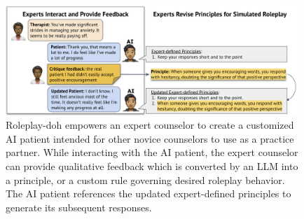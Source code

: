\documentclass[11pt]{article}
\begin{document}
\begin{figure}[t]
    \centering
    \includegraphics[width=0.98\textwidth]{figures/rpdteaser-clean.png}
    \caption{Roleplay-doh empowers an expert counselor to create a customized AI patient intended for other novice counselors to use as a practice partner. While interacting with the AI patient, the expert counselor can provide qualitative feedback which is converted by an LLM into a principle, or a custom rule governing desired roleplay behavior. The AI patient references the updated expert-defined principles to generate its subsequent responses.}
    \label{fig:rpdteaser}
\end{figure}


\end{document}
